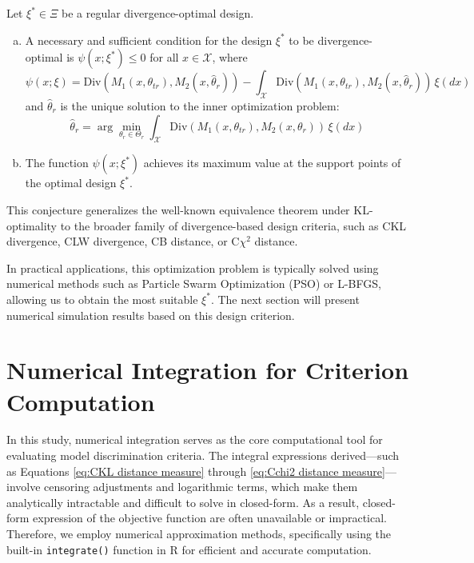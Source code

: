 \begin{conjecture}
Let $\xi^* \in \Xi$ be a regular divergence-optimal design.

\begin{enumerate}[(a)]
\item A necessary and sufficient condition for the design $\xi^*$ to be divergence-optimal is $\psi(x; \xi^*) \leq 0$ for all $x \in \mathcal{X}$, where
\begin{equation}
\psi(x; \xi) = \mathrm{Div}(M_1(x, \theta_{tr}), M_2(x, \hat{\theta}_r)) - \int_{\mathcal{X}} \mathrm{Div}(M_1(x, \theta_{tr}), M_2(x, \hat{\theta}_r)) \, \xi(dx)
\end{equation}
and $\hat{\theta}_r$ is the unique solution to the inner optimization problem:
\begin{equation}
\hat{\theta}_r = \arg\min_{\theta_r \in \Theta_r} \int_{\mathcal{X}} \mathrm{Div}(M_1(x, \theta_{tr}), M_2(x, \theta_r)) \, \xi(dx)
\end{equation}

\item The function $\psi(x; \xi^*)$ achieves its maximum value at the support points of the optimal design $\xi^*$.
\end{enumerate}
\end{conjecture}

\hspace*{8mm} This conjecture generalizes the well-known equivalence theorem under KL-optimality to the broader family of divergence-based design criteria, such as CKL divergence, CLW divergence, CB distance, or C$\chi^2$ distance.

\hspace*{8mm} In practical applications, this optimization problem is typically solved using numerical methods such as Particle Swarm Optimization (PSO) or L-BFGS, allowing us to obtain the most suitable $\xi^*$. The next section will present numerical simulation results based on this design criterion.

\section{Numerical Integration for Criterion Computation} \label{SEC: Numerical Integration}

\hspace*{8mm} In this study, numerical integration serves as the core computational tool for evaluating model discrimination criteria. The integral expressions derived—such as Equations \eqref{eq:CKL distance measure} through \eqref{eq:Cchi2 distance measure}—involve censoring adjustments and logarithmic terms, which make them analytically intractable and difficult to solve in closed-form. As a result, closed-form expression of the objective function are often unavailable or impractical. Therefore, we employ numerical approximation methods, specifically using the built-in \verb|integrate()| function in R for efficient and accurate computation.

